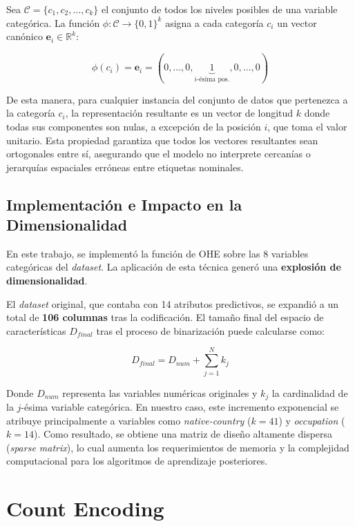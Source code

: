 \documentclass[a4paper,10pt]{book}
\begin{document}
		Sea $\mathcal{C} = \{c_1, c_2, \dots, c_k\}$ el conjunto de todos los niveles posibles de una variable categórica. La función $\phi: \mathcal{C} \rightarrow \{0, 1\}^k$ asigna a cada categoría $c_i$ un vector canónico $\mathbf{e}_i \in \mathbb{R}^k$:
		
		\begin{equation}
			\phi(c_i) = \mathbf{e}_i = (0, \dots, 0, \underbrace{1}_{i\text{-ésima pos.}}, 0, \dots, 0)
		\end{equation}
		
		De esta manera, para cualquier instancia del conjunto de datos que pertenezca a la categoría $c_i$, la representación resultante es un vector de longitud $k$ donde todas sus componentes son nulas, a excepción de la posición $i$, que toma el valor unitario. Esta propiedad garantiza que todos los vectores resultantes sean ortogonales entre sí, asegurando que el modelo no interprete cercanías o jerarquías espaciales erróneas entre etiquetas nominales.
		
	\subsection{Implementación e Impacto en la Dimensionalidad}

		En este trabajo, se implementó la función de OHE sobre las 8 variables categóricas del \textit{dataset}. La aplicación de esta técnica generó una \textbf{explosión de dimensionalidad}.
		
		El \textit{dataset} original, que contaba con 14 atributos predictivos, se expandió a un total de \textbf{106 columnas} tras la codificación. El tamaño final del espacio de características $D_{final}$ tras el proceso de binarización puede calcularse como:
		
		\begin{equation}
			D_{final} = D_{num} + \sum_{j=1}^{N} k_j
		\end{equation}
		
		Donde $D_{num}$ representa las variables numéricas originales y $k_j$ la cardinalidad de la $j$-ésima variable categórica. En nuestro caso, este incremento exponencial se atribuye principalmente a variables como \textit{native-country} ($k=41$) y \textit{occupation} ($k=14$). Como resultado, se obtiene una matriz de diseño altamente dispersa (\textit{sparse matrix}), lo cual aumenta los requerimientos de memoria y la complejidad computacional para los algoritmos de aprendizaje posteriores.
		
	\section{Count Encoding}
		
\end{document}
